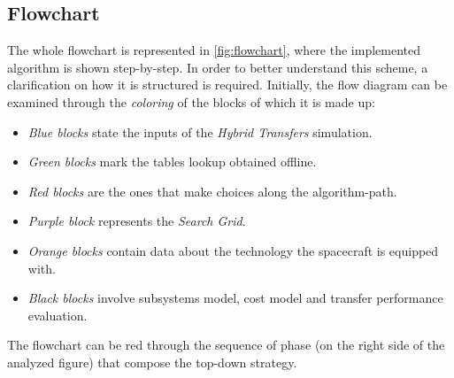 \subsection{Flowchart}
\label{subsec:flowchart}
The whole flowchart is represented in \figurename\ref{fig:flowchart}, where the  implemented algorithm is shown step-by-step. In order to better understand this scheme, a clarification on how it is structured is required. Initially, the flow diagram can be examined through the \emph{coloring} of the blocks of which it is made up:
\begin{itemize}
\item \emph{Blue blocks} state the inputs of the \emph{Hybrid Transfers} simulation.
\item \emph{Green blocks} mark the tables lookup obtained offline.
\item \emph{Red blocks} are the ones that make choices along the algorithm-path.
\item \emph{Purple block} represents the \emph{Search Grid}. 
\item \emph{Orange blocks} contain data about  the technology the spacecraft is equipped with.
\item \emph{Black blocks} involve subsystems model, cost model and transfer performance evaluation. 
\end{itemize}
The flowchart can be red through the sequence of phase (on the right side of the analyzed figure) that compose the top-down strategy. 

